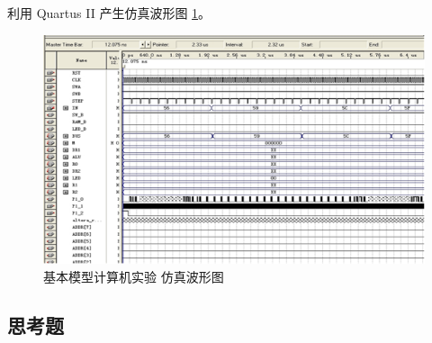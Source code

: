 利用 Quartus II 产生仿真波形图 \ref{fig:wave6}。

\begin{figure}[H]
\centering
\includegraphics[width=\textwidth]{images/wave6.png}
\caption{基本模型计算机实验 仿真波形图}
\label{fig:wave6}
\end{figure}

\subsection{思考题}

